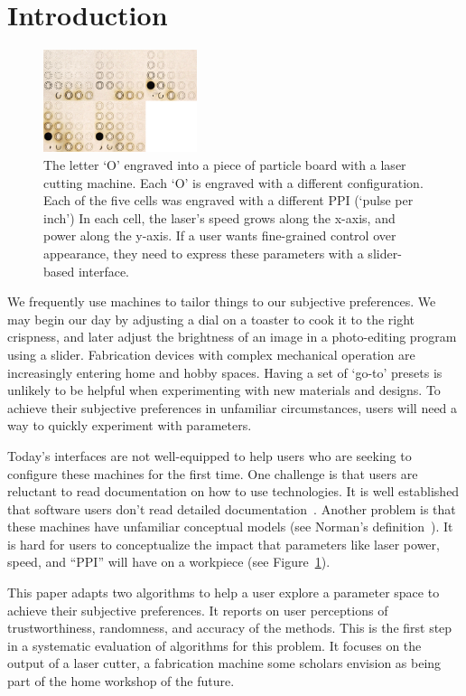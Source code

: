 \section{Introduction}

\begin{figure}
  \centering
  \includegraphics[width=0.4\textwidth]{figures/engravings}
  \caption{%
    The letter `O' engraved into a piece of particle board with a laser cutting machine.
    Each `O' is engraved with a different configuration.
    Each of the five cells was engraved with a different PPI (`pulse per inch')
    In each cell, the laser's speed grows along the x-axis, and power along the y-axis.
    If a user wants fine-grained control over appearance, they need to express these parameters with a slider-based interface.
  }\label{fig:engravings}
\end{figure}

We frequently use machines to tailor things to our subjective preferences.
We may begin our day by adjusting a dial on a toaster to cook it to the right crispness, and later adjust the brightness of an image in a photo-editing program using a slider.
Fabrication devices with complex mechanical operation are increasingly entering home and hobby spaces.
Having a set of `go-to' presets is unlikely to be helpful when experimenting with new materials and designs.
To achieve their subjective preferences in unfamiliar circumstances, users will need a way to quickly experiment with parameters.

Today's interfaces are not well-equipped to help users who are seeking to configure these machines for the first time.
One challenge is that users are reluctant to read documentation on how to use technologies.
It is well established that software users don't read detailed documentation~\cite{carroll_nurnberg_1990}.
Another problem is that these machines have unfamiliar conceptual models (see Norman's definition~\cite{norman_design_2002}).
It is hard for users to conceptualize the impact that parameters like laser power, speed, and ``PPI'' will have on a workpiece (see Figure~\ref{fig:engravings}).

This paper adapts two algorithms to help a user explore a parameter space to achieve their subjective preferences.
It reports on user perceptions of trustworthiness, randomness, and accuracy of the methods.
This is the first step in a systematic evaluation of algorithms for this problem. 
It focuses on the output of a laser cutter, a fabrication machine some scholars envision as being part of the home workshop of the future.

